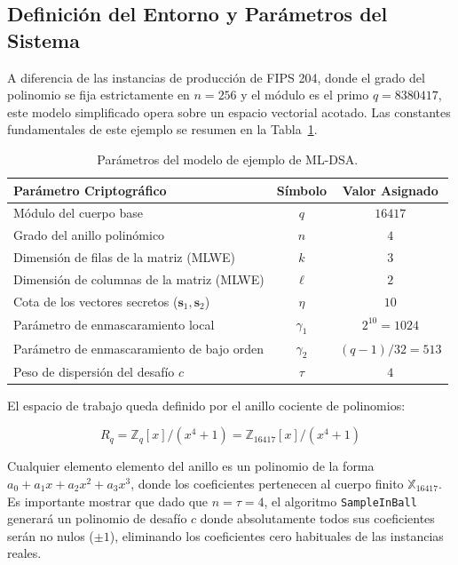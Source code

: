 \documentclass[11pt, a4paper]{report}
\theoremstyle{definition}
\begin{document}
\subsection{Definición del Entorno y Parámetros del Sistema}

A diferencia de las instancias de producción de FIPS 204, donde el grado del polinomio se fija estrictamente en $n=256$ y el módulo es el primo $q=8380417$, este modelo simplificado opera sobre un espacio vectorial acotado. Las constantes fundamentales de este ejemplo se resumen en la Tabla~\ref{tab:parametros_juguete}.

\begin{table}[H]
\centering
\caption{Parámetros del modelo de ejemplo de ML-DSA.}
\label{tab:parametros_juguete}
\begin{tabular}{lcc}
\hline
\textbf{Parámetro Criptográfico} & \textbf{Símbolo} & \textbf{Valor Asignado} \\ \hline
Módulo del cuerpo base & $q$ & $16417$ \\
Grado del anillo polinómico & $n$ & $4$ \\
Dimensión de filas de la matriz (MLWE) & $k$ & $3$ \\
Dimensión de columnas de la matriz (MLWE) & $\ell$ & $2$ \\
Cota de los vectores secretos ($\mathbf{s}_1, \mathbf{s}_2$) & $\eta$ & $10$ \\
Parámetro de enmascaramiento local & $\gamma_1$ & $2^{10} = 1024$ \\
Parámetro de enmascaramiento de bajo orden & $\gamma_2$ & $(q-1)/32 = 513$ \\
Peso de dispersión del desafío $c$ & $\tau$ & $4$ \\
\hline
\end{tabular}
\end{table}

El espacio de trabajo queda definido por el anillo cociente de polinomios:

\begin{equation}
    R_q = \mathbb{Z}_q[x] / (x^4 + 1) = \mathbb{Z}_{16417}[x] / (x^4 + 1)
\end{equation}

Cualquier elemento elemento del anillo es un polinomio de la forma $a_0 + a_1x + a_2x^2 + a_3x^3$, donde los coeficientes pertenecen al cuerpo finito $\mathbb{X}_{16417}$. Es importante mostrar que dado que $n = \tau = 4$, el algoritmo \texttt{SampleInBall} generará un polinomio de desafío $c$ donde absolutamente todos sus coeficientes serán no nulos ($\pm 1$), eliminando los coeficientes cero habituales de las instancias reales.
\end{document}
